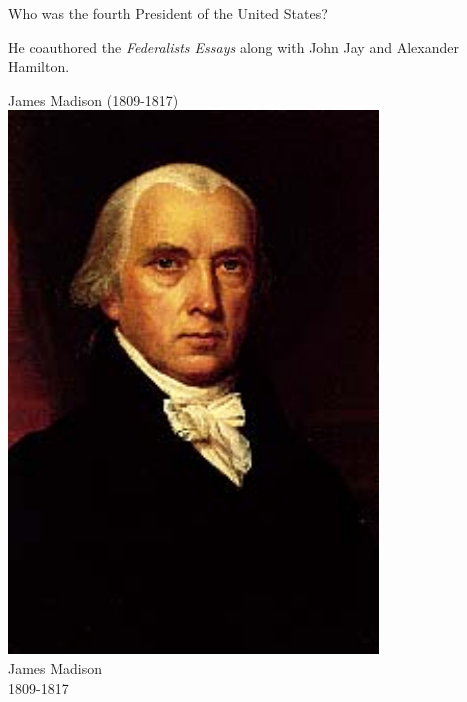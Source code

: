 \documentclass{article}
\def\rescale{.4} %
\begin{document}
\begin{card}
    \raggedright
    Who was the fourth President of the United States? \ifecListing\newline\fi
    \begin{fillIn}
    \end{fillIn}
\begin{response}
    \begin{hint}\raggedright
        He coauthored the \textsl{Federalists Essays} along with
        John Jay and Alexander Hamilton.
        \begin{fillIn}
        \end{fillIn}
    \end{hint}
    \begin{answer}
    \ifecListing
        James Madison (1809-1817)
    \else\centering
            \includegraphics[scale=\rescale]{presidents/jm4}\\
            James Madison\\
            1809-1817
    \fi
    \end{answer}
\end{response}
\end{card}
\end{document}
